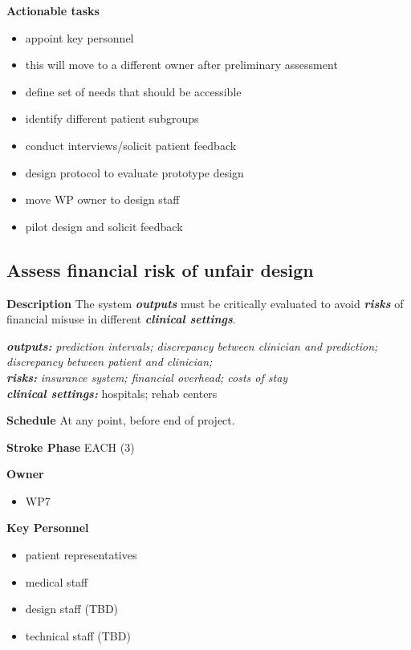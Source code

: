\documentclass[
  letterpaper,
  DIV=11,
  numbers=noendperiod]{scrreport}
\providecommand{\tightlist}{%
  \setlength{\itemsep}{0pt}\setlength{\parskip}{0pt}}\usepackage{longtable,booktabs,array}
\begin{document}
\textbf{Actionable tasks}

\begin{itemize}
\tightlist
\item
  appoint key personnel
\item
  this will move to a different owner after preliminary assessment
\item
  define set of needs that should be accessible
\item
  identify different patient subgroups
\item
  conduct interviews/solicit patient feedback
\item
  design protocol to evaluate prototype design
\item
  move WP owner to design staff
\item
  pilot design and solicit feedback
\end{itemize}

\hypertarget{assess-financial-risk-of-unfair-design}{%
\subsection{Assess financial risk of unfair
design}\label{assess-financial-risk-of-unfair-design}}

\textbf{Description} The system \textbf{\emph{outputs}} must be
critically evaluated to avoid \textbf{\emph{risks}} of financial misuse
in different \textbf{\emph{clinical settings}}.

\textbf{\emph{outputs:}} \emph{prediction intervals; discrepancy between
clinician and prediction; discrepancy between patient and clinician;}\\
\textbf{\emph{risks:}} \emph{insurance system; financial overhead; costs
of stay}\\
\textbf{\emph{clinical settings:}} hospitals; rehab centers

\textbf{Schedule} At any point, before end of project.

\textbf{Stroke Phase} EACH (3)

\textbf{Owner}

\begin{itemize}
\tightlist
\item
  WP7
\end{itemize}

\textbf{Key Personnel}

\begin{itemize}
\tightlist
\item
  patient representatives
\item
  medical staff
\item
  design staff (TBD)
\item
  technical staff (TBD)
\end{itemize}
\end{document}
